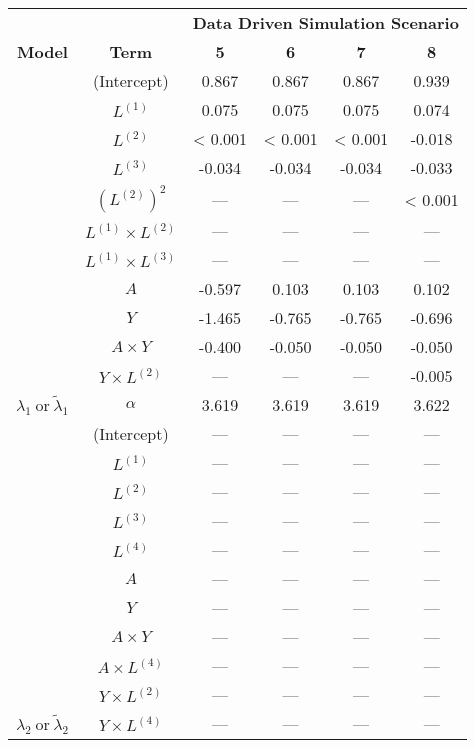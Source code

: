\begin{sidewaystable}
\begin{minipage}[t]{0.5\textwidth}
\begin{tabular}[t]{>{}ccccc>{}c}
\hline
\multicolumn{1}{c}{\textbf{ }} & \multicolumn{1}{c}{\textbf{ }} & \multicolumn{4}{c}{\textbf{Data Driven Simulation Scenario}} \\
\cmidrule{3-6}
\textbf{Model} & \textbf{Term} & \textbf{5} & \textbf{6} & \textbf{7} & \textbf{8}\\
\hline
 & (Intercept) & 0.867 & 0.867 & 0.867 & 0.939\\
\cmidrule{2-6}
 & $L^{(1)}$ & 0.075 & 0.075 & 0.075 & 0.074\\
\cmidrule{2-6}
 & $L^{(2)}$ & < 0.001 & < 0.001 & < 0.001 & -0.018\\
\cmidrule{2-6}
 & $L^{(3)}$ & -0.034 & -0.034 & -0.034 & -0.033\\
\cmidrule{2-6}
 & $(L^{(2)})^2$ & --- & --- & --- & < 0.001\\
\cmidrule{2-6}
 & $L^{(1)} \times L^{(2)}$ & --- & --- & --- & ---\\
\cmidrule{2-6}
 & $L^{(1)} \times L^{(3)}$ & --- & --- & --- & ---\\
\cmidrule{2-6}
 & $A$ & -0.597 & 0.103 & 0.103 & 0.102\\
\cmidrule{2-6}
 & $Y$ & -1.465 & -0.765 & -0.765 & -0.696\\
\cmidrule{2-6}
 & $A\times Y$ & -0.400 & -0.050 & -0.050 & -0.050\\
\cmidrule{2-6}
 & $Y \times L^{(2)}$ & --- & --- & --- & -0.005\\
\cmidrule{2-6}
\multirow{-12}{*}{\centering\arraybackslash $\lambda_1~\text{or}~\tilde\lambda_1$} & $\alpha$ & 3.619 & 3.619 & 3.619 & 3.622\\
\cmidrule{1-6}
 & (Intercept) & --- & --- & --- & ---\\
\cmidrule{2-6}
 & $L^{(1)}$ & --- & --- & --- & ---\\
\cmidrule{2-6}
 & $L^{(2)}$ & --- & --- & --- & ---\\
\cmidrule{2-6}
 & $L^{(3)}$ & --- & --- & --- & ---\\
\cmidrule{2-6}
 & $L^{(4)}$ & --- & --- & --- & ---\\
\cmidrule{2-6}
 & $A$ & --- & --- & --- & ---\\
\cmidrule{2-6}
 & $Y$ & --- & --- & --- & ---\\
\cmidrule{2-6}
 & $A\times Y$ & --- & --- & --- & ---\\
\cmidrule{2-6}
 & $A \times L^{(4)}$ & --- & --- & --- & ---\\
\cmidrule{2-6}
 & $Y \times L^{(2)}$ & --- & --- & --- & ---\\
\cmidrule{2-6}
\multirow{-11}{*}{\centering\arraybackslash $\lambda_2~\text{or}~\tilde\lambda_2$} & $Y \times L^{(4)}$ & --- & --- & --- & ---\\
\hline
\end{tabular}
\end{minipage}
\end{sidewaystable}



